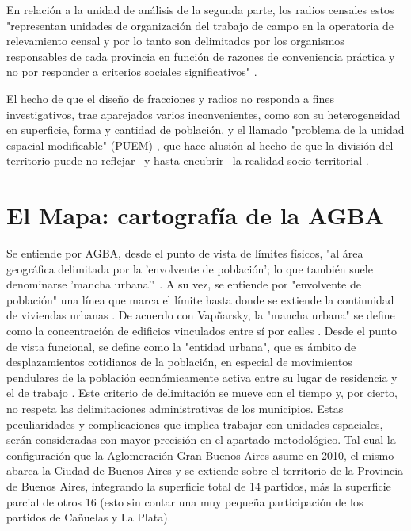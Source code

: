 En relación a la unidad de análisis de la segunda parte, los radios censales estos "representan unidades de organización del trabajo de campo en la operatoria de relevamiento censal y por lo tanto son delimitados por los organismos responsables de cada provincia en función de razones de conveniencia práctica y no por responder a criterios sociales significativos" \cite[p~630]{robirosa} . 

El hecho de que el diseño de fracciones y radios no responda a fines investigativos, trae aparejados varios inconvenientes, como son su heterogeneidad en superficie, forma y cantidad de población, y el llamado "problema de la unidad espacial modificable" (PUEM) \cite{openshaw1977,openshaw1984}, que hace alusión al hecho de que la división del territorio puede no reflejar –y hasta encubrir– la realidad socio-territorial \cite{marcos2012}. 



	\section{El Mapa: cartografía de la AGBA}\label{cap2-mapa}
	
Se entiende por AGBA, desde el punto de vista de límites físicos, "al área geográfica delimitada por la 'envolvente de población'; lo que también suele denominarse 'mancha urbana'" \cite{indec2003e}. A su vez, se entiende por "envolvente de población" una línea que marca el límite hasta donde se extiende la continuidad de viviendas urbanas \cite{indec2003e}. De acuerdo con Vapñarsky, la "mancha urbana" se define como la concentración de edificios vinculados entre sí por calles \cite{vapniarsky1995,vapniarsky1998}. Desde el punto de vista funcional, se define como la "entidad urbana", que es ámbito de desplazamientos cotidianos de la población, en especial de movimientos pendulares de la población económicamente activa entre su lugar de residencia y el de trabajo \cite{bertoncello,torres1990}. Este criterio de delimitación se mueve con el tiempo y, por cierto, no respeta las delimitaciones administrativas de los municipios.  Estas peculiaridades y complicaciones que implica trabajar con unidades espaciales, serán consideradas con mayor precisión en el apartado metodológico. Tal cual la configuración que la Aglomeración Gran Buenos Aires asume en 2010, el mismo abarca la Ciudad de Buenos Aires y se extiende sobre el territorio de la Provincia de Buenos Aires, integrando la superficie total de 14 partidos, más la superficie parcial de otros 16 (esto sin contar una muy pequeña participación de los partidos de Cañuelas y La Plata).
	
